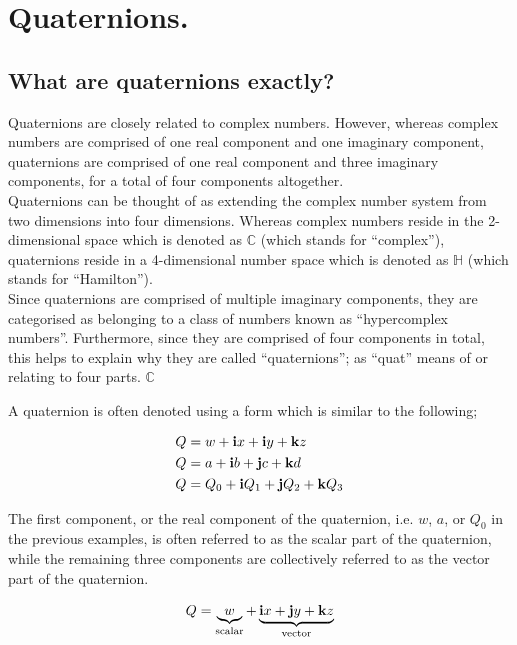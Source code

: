 \chapter{Quaternions.}

\section{What are quaternions exactly?}

Quaternions are closely related to complex numbers. However, whereas complex numbers are comprised of one real component and one
imaginary component, quaternions are comprised of one real component and three imaginary components, for a total of four
components altogether. \\

Quaternions can be thought of as extending the complex number system from two dimensions into four dimensions. Whereas
complex numbers reside in the 2-dimensional space which is denoted as \(\mathbb{C}\) (which stands for ``complex''),
quaternions reside in a 4-dimensional number space which is denoted as \(\mathbb{H}\) (which stands for ``Hamilton''). \\

Since quaternions are comprised of multiple imaginary components, they are categorised as belonging to a class of
numbers known as ``hypercomplex numbers''. Furthermore, since they are comprised of four components in total, this helps
to explain why they are called ``quaternions''; as ``quat'' means of or relating to four parts. \(\mathbb{C}\)

A quaternion is often denoted using a form which is similar to the following;

\begin{align*}
Q & = w   + \bm{\mathrm{i}} x   + \bm{\mathrm{i}} y   + \bm{\mathrm{k}} z  \\
Q & = a   + \bm{\mathrm{i}} b   + \bm{\mathrm{j}} c   + \bm{\mathrm{k}} d  \\
Q & = Q_0 + \bm{\mathrm{i}} Q_1 + \bm{\mathrm{j}} Q_2 + \bm{\mathrm{k}} Q_3
\end{align*}
\vspace{0.0\baselineskip}

The first component, or the real component of the quaternion, i.e. \(w\), \(a\), or \(Q_0\) in the previous examples,
is often referred to as the scalar part of the quaternion, while the remaining three components are collectively
referred to as the vector part of the quaternion.

\begin{equation*}
Q = \underbrace{w}_{\text{scalar}} + \underbrace{\bm{\mathrm{i}} x + \bm{\mathrm{j}} y + \bm{\mathrm{k}}z}_{\text{vector}}
\end{equation*}

